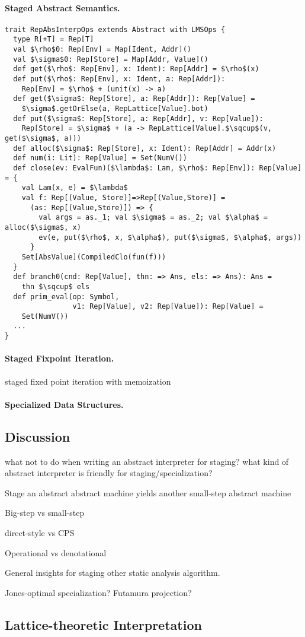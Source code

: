 \paragraph{Staged Abstract Semantics.} 

\begin{lstlisting}
trait RepAbsInterpOps extends Abstract with LMSOps {
  type R[+T] = Rep[T]
  val $\rho$0: Rep[Env] = Map[Ident, Addr]()
  val $\sigma$0: Rep[Store] = Map[Addr, Value]()
  def get($\rho$: Rep[Env], x: Ident): Rep[Addr] = $\rho$(x)
  def put($\rho$: Rep[Env], x: Ident, a: Rep[Addr]): 
    Rep[Env] = $\rho$ + (unit(x) -> a)
  def get($\sigma$: Rep[Store], a: Rep[Addr]): Rep[Value] = 
    $\sigma$.getOrElse(a, RepLattice[Value].bot)
  def put($\sigma$: Rep[Store], a: Rep[Addr], v: Rep[Value]): 
    Rep[Store] = $\sigma$ + (a -> RepLattice[Value].$\sqcup$(v, get($\sigma$, a)))
  def alloc($\sigma$: Rep[Store], x: Ident): Rep[Addr] = Addr(x)
  def num(i: Lit): Rep[Value] = Set(NumV())
  def close(ev: EvalFun)($\lambda$: Lam, $\rho$: Rep[Env]): Rep[Value] = {
    val Lam(x, e) = $\lambda$
    val f: Rep[(Value, Store)]=>Rep[(Value,Store)] = 
      (as: Rep[(Value,Store)]) => {
        val args = as._1; val $\sigma$ = as._2; val $\alpha$ = alloc($\sigma$, x)
        ev(e, put($\rho$, x, $\alpha$), put($\sigma$, $\alpha$, args))
      }
    Set[AbsValue](CompiledClo(fun(f)))
  }
  def branch0(cnd: Rep[Value], thn: => Ans, els: => Ans): Ans =
    thn $\sqcup$ els
  def prim_eval(op: Symbol, 
                v1: Rep[Value], v2: Rep[Value]): Rep[Value] = 
    Set(NumV())
  ...
}
\end{lstlisting}

\paragraph{Staged Fixpoint Iteration.} staged fixed point iteration with memoization 

\paragraph{Specialized Data Structures.}

\subsection{Discussion}
what not to do when writing an abstract interpreter for staging?
what kind of abstract interpreter is friendly for staging/specialization?

Stage an abstract abstract machine yields another small-step abstract machine

Big-step vs small-step

direct-style vs CPS

Operational vs denotational

General insights for staging other static analysis algorithm.

\cite{10.1007/3-540-61580-6_11}

Jones-optimal specialization?
Futamura projection?

\subsection{Lattice-theoretic Interpretation}
